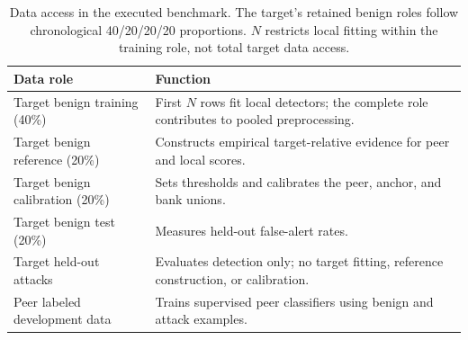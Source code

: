 \begin{table}[!htbp]
\centering\small
\caption{Data access in the executed benchmark. The target's retained benign roles follow chronological 40/20/20/20 proportions. $N$ restricts local fitting within the training role, not total target data access.}
\label{tab:data-access}
\begin{tabular}{>{\raggedright\arraybackslash}p{4.1cm}>{\raggedright\arraybackslash}p{10cm}}
\toprule
Data role & Function \\
\midrule
Target benign training (40\%) & First $N$ rows fit local detectors; the complete role contributes to pooled preprocessing. \\
Target benign reference (20\%) & Constructs empirical target-relative evidence for peer and local scores. \\
Target benign calibration (20\%) & Sets thresholds and calibrates the peer, anchor, and bank unions. \\
Target benign test (20\%) & Measures held-out false-alert rates. \\
Target held-out attacks & Evaluates detection only; no target fitting, reference construction, or calibration. \\
Peer labeled development data & Trains supervised peer classifiers using benign and attack examples. \\
\bottomrule
\end{tabular}
\end{table}
